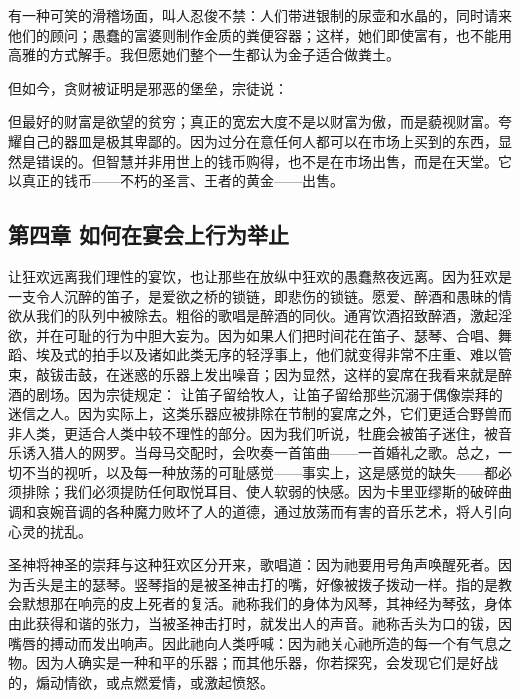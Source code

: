 有一种可笑的滑稽场面，叫人忍俊不禁：人们带进银制的尿壶和水晶的，同时请来他们的顾问；愚蠢的富婆则制作金质的粪便容器；这样，她们即使富有，也不能用高雅的方式解手。我但愿她们整个一生都认为金子适合做粪土。\par

但如今，贪财被证明是邪恶的堡垒，宗徒说：\par

但最好的财富是欲望的贫穷；真正的宽宏大度不是以财富为傲，而是藐视财富。夸耀自己的器皿是极其卑鄙的。因为过分在意任何人都可以在市场上买到的东西，显然是错误的。但智慧并非用世上的钱币购得，也不是在市场出售，而是在天堂。它以真正的钱币——不朽的圣言、王者的黄金——出售。\par


\subsection{第四章 如何在宴会上行为举止}

让狂欢远离我们理性的宴饮，也让那些在放纵中狂欢的愚蠢熬夜远离。因为狂欢是一支令人沉醉的笛子，是爱欲之桥的锁链，即悲伤的锁链。愿爱、醉酒和愚昧的情欲从我们的队列中被除去。粗俗的歌唱是醉酒的同伙。通宵饮酒招致醉酒，激起淫欲，并在可耻的行为中胆大妄为。因为如果人们把时间花在笛子、瑟琴、合唱、舞蹈、埃及式的拍手以及诸如此类无序的轻浮事上，他们就变得非常不庄重、难以管束，敲钹击鼓，在迷惑的乐器上发出噪音；因为显然，这样的宴席在我看来就是醉酒的剧场。因为宗徒规定： 让笛子留给牧人，让笛子留给那些沉溺于偶像崇拜的迷信之人。因为实际上，这类乐器应被排除在节制的宴席之外，它们更适合野兽而非人类，更适合人类中较不理性的部分。因为我们听说，牡鹿会被笛子迷住，被音乐诱入猎人的网罗。当母马交配时，会吹奏一首笛曲——一首婚礼之歌。总之，一切不当的视听，以及每一种放荡的可耻感觉——事实上，这是感觉的缺失——都必须排除；我们必须提防任何取悦耳目、使人软弱的快感。因为卡里亚缪斯的破碎曲调和哀婉音调的各种魔力败坏了人的道德，通过放荡而有害的音乐艺术，将人引向心灵的扰乱。\par

圣神将神圣的崇拜与这种狂欢区分开来，歌唱道：因为祂要用号角声唤醒死者。因为舌头是主的瑟琴。竖琴指的是被圣神击打的嘴，好像被拨子拨动一样。指的是教会默想那在响亮的皮上死者的复活。祂称我们的身体为风琴，其神经为琴弦，身体由此获得和谐的张力，当被圣神击打时，就发出人的声音。祂称舌头为口的钹，因嘴唇的搏动而发出响声。因此祂向人类呼喊：因为祂关心祂所造的每一个有气息之物。因为人确实是一种和平的乐器；而其他乐器，你若探究，会发现它们是好战的，煽动情欲，或点燃爱情，或激起愤怒。\par

